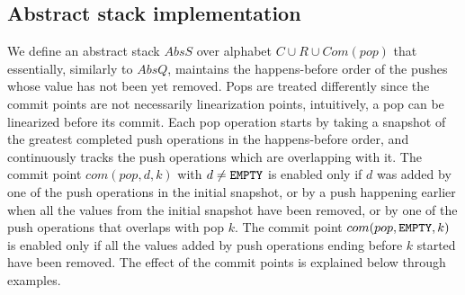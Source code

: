\vspace{-3mm}
\subsection{Abstract stack implementation}
\vspace{-1mm}
We define an abstract stack $AbsS$ over alphabet $C\cup R\cup Com(pop)$ that essentially, similarly to $AbsQ$, maintains the happens-before order of the pushes whose value has not been yet removed. Pops are treated differently since the commit points are not necessarily linearization points, intuitively, a pop can be linearized before its commit. Each pop operation starts by taking a snapshot of the greatest completed push operations in the happens-before order, and continuously tracks the push operations which are overlapping with it. The commit point $com(pop,d,k)$ with $d\neq {\tt EMPTY}$ is enabled only if $d$ was added by one of the push operations in the initial snapshot, or by a push happening earlier when all the values from the initial snapshot have been removed, or by one of the push operations that overlaps with pop $k$. The commit point $com(pop,{\tt EMPTY},k)$ is enabled only if all the values added by push operations ending before $k$ started have been removed. The effect of the commit points is explained below through examples.
\vspace{-.4mm}

